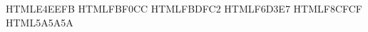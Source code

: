 
\definecolor{flProc} {HTML}{E4EEFB}   %
\definecolor{flDec}  {HTML}{FBF0CC}   %
\definecolor{flUse}  {HTML}{FBDFC2}   %
\definecolor{flEnd}  {HTML}{F6D3E7}   %
\definecolor{flStop} {HTML}{F8CFCF}   %
\definecolor{flEdge} {HTML}{5A5A5A}   %


